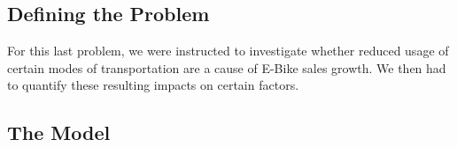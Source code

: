 \subsection{Defining the Problem}
For this last problem, we were instructed to investigate whether reduced usage of certain modes of transportation are a cause of E-Bike sales growth. We then had to quantify these resulting impacts on certain factors.

\subsection{The Model}



\newpage
